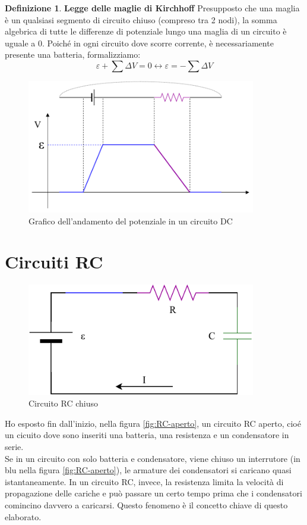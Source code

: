 \documentclass[a3paper, twoside, openany]{book}
\theoremstyle{definition}
\newtheorem{definition}{Definizione}
\begin{document}
\begin{definition}{\textbf{Legge delle maglie di Kirchhoff}}
Presupposto che una maglia è un qualsiasi segmento di circuito chiuso (compreso tra 2 nodi), la somma algebrica di tutte le differenze di potenziale lungo una maglia di un circuito è uguale a 0. Poiché in ogni circuito dove scorre corrente, è necessariamente presente una batteria, formalizziamo: $$\varepsilon+\sum{\Delta V}=0\longleftrightarrow \varepsilon=-\sum{\Delta V}$$
\end{definition}
\begin{figure}[htp]
    \centering
    \includegraphics[width=10cm]{Circuito RC-Maglia}
    \caption{Grafico dell'andamento del potenziale in un circuito DC}
    \label{fig:maglia}
\end{figure} \clearpage
\section{Circuiti RC}
\begin{figure}[htp]
    \centering
    \includegraphics[width=10cm]{Circuito RC-chiuso}
    \caption{Circuito RC chiuso}
    \label{fig:RC-chiuso}
\end{figure}

Ho esposto fin dall'inizio, nella figura \ref{fig:RC-aperto}, un circuito RC aperto, cioé un cicuito dove sono inseriti una batteria, una resistenza e un condensatore in serie. \\ Se in un circuito con solo batteria e condensatore, viene chiuso un interrutore (in blu nella figura \ref{fig:RC-aperto}), le armature dei condensatori si caricano quasi istantaneamente. In un circuito RC, invece, la resistenza limita la velocità di propagazione delle cariche e può passare un certo tempo prima che i condensatori comincino davvero a caricarsi. Questo fenomeno è il concetto chiave di questo elaborato.
\end{document}
